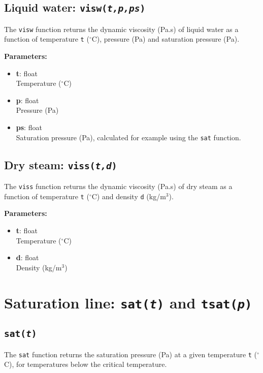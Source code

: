 \subsection{Liquid water: \texttt{visw(\emph{t,p,ps})}}

The \texttt{visw} function returns the dynamic viscosity (Pa.s) of liquid water as a function of temperature \texttt{t} ($^{\circ}$C), pressure (Pa) and saturation pressure (Pa).

\textbf{Parameters:}
\begin{itemize}
\item \textbf{t}: float\\
  Temperature ($^{\circ}$C)
\item \textbf{p}: float\\
  Pressure (Pa)
\item \textbf{ps}: float\\
  Saturation pressure (Pa), calculated for example using the \texttt{sat} function.
\end{itemize}

\subsection{Dry steam: \texttt{viss(\emph{t,d})}}

The \texttt{viss} function returns the dynamic viscosity (Pa.s) of dry steam as a function of temperature \texttt{t} ($^{\circ}$C) and density \texttt{d} (kg/m$^3$).

\textbf{Parameters:}
\begin{itemize}
\item \textbf{t}: float\\
  Temperature ($^{\circ}$C)
\item \textbf{d}: float\\
  Density (kg/m$^3$)
\end{itemize}

\section{Saturation line: \texttt{sat(\emph{t})} and \texttt{tsat(\emph{p})}}

\subsection{\texttt{sat(\emph{t})}}

The \texttt{sat} function returns the saturation pressure (Pa) at a given temperature \texttt{t} ($^{\circ}$C), for temperatures below the critical temperature.


